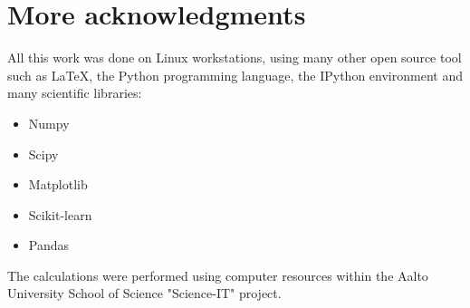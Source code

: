 \chapter{More acknowledgments}

All this work was done on Linux workstations, using many other open source tool
such as \LaTeX, the Python programming language, the IPython environment
\autocite{IPython07} and many scientific libraries:
\begin{itemize}
	\item Numpy \autocite{Numpy11}
	\item Scipy \autocite{Scipy14}
	\item Matplotlib \autocite{Matplotlib07}
	\item Scikit-learn \autocite{Scikit12}
	\item Pandas \autocite{Pandas10}
\end{itemize}

The calculations were performed using computer resources within the Aalto
University School of Science "Science-IT" project.
